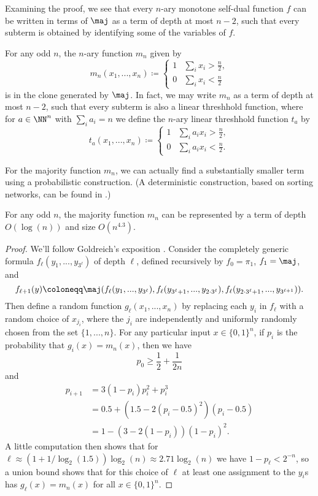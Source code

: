 Examining the proof, we see that every $n$-ary monotone self-dual function $f$ can be written in terms of $\maj$ as a term of depth at most $n-2$, such that every subterm is obtained by identifying some of the variables of $f$.

\begin{cor} For any odd $n$, the $n$-ary function $m_n$ given by
\[
m_n(x_1, ..., x_n) \coloneqq \begin{cases}1 & \sum_i x_i > \frac{n}{2},\\ 0 & \sum_i x_i < \frac{n}{2}\end{cases}
\]
is in the clone generated by $\maj$. In fact, we may write $m_n$ as a term of depth at most $n-2$, such that every subterm is also a linear threshhold function, where for $a \in \NN^n$ with $\sum_i a_i = n$ we define the $n$-ary linear threshhold function $t_a$ by
\[
t_a(x_1, ..., x_n) \coloneqq \begin{cases}1 & \sum_i a_ix_i > \frac{n}{2},\\ 0 & \sum_i a_ix_i < \frac{n}{2}.\end{cases}
\]
\end{cor}

For the majority function $m_n$, we can actually find a substantially smaller term using a probabilistic construction. (A deterministic construction, based on sorting networks, can be found in \cite{majority-sorting-networks}.)

\begin{prop} For any odd $n$, the majority function $m_n$ can be represented by a term of depth $O(\log(n))$ and size $O(n^{4.3})$.
\end{prop}
\begin{proof} We'll follow Goldreich's exposition \cite{goldreich-majority}. Consider the completely generic formula $f_\ell(y_1, ..., y_{3^\ell})$ of depth $\ell$, defined recursively by $f_0 = \pi_1$, $f_1 = \maj$, and
\[
f_{\ell+1}(y) \coloneqq \maj(f_\ell(y_1, ..., y_{3^\ell}), f_\ell(y_{3^\ell+1}, ..., y_{2\cdot 3^\ell}), f_\ell(y_{2\cdot 3^\ell+1}, ..., y_{3^{\ell+1}})).
\]
Then define a random function $g_{\ell}(x_1, ..., x_n)$ by replacing each $y_i$ in $f_\ell$ with a random choice of $x_{j_i}$, where the $j_i$ are independently and uniformly randomly chosen from the set $\{1, ..., n\}$. For any particular input $x \in \{0,1\}^n$, if $p_i$ is the probability that $g_i(x) = m_n(x)$, then we have
\[
p_0 \ge \frac{1}{2} + \frac{1}{2n}
\]
and
\begin{align*}
p_{i+1} &= 3(1-p_i)p_i^2 + p_i^3\\
&= 0.5 + (1.5 - 2(p_i-0.5)^2)(p_i-0.5)\\
&= 1 - (3 - 2(1-p_i))(1-p_i)^2.
\end{align*}
A little computation then shows that for $\ell \approx (1+1/\log_2(1.5))\log_2(n) \approx 2.71\log_2(n)$ we have $1-p_\ell < 2^{-n}$, so a union bound shows that for this choice of $\ell$ at least one assignment to the $y_i$s has $g_\ell(x) = m_n(x)$ for all $x \in \{0,1\}^n$.
\end{proof}

